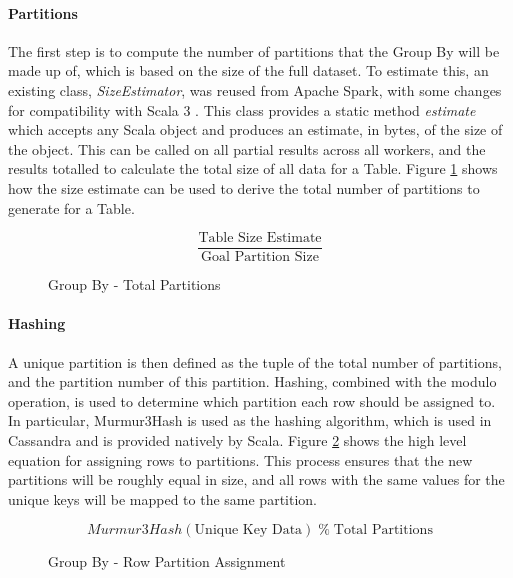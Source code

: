 \paragraph{Partitions}
The first step is to compute the number of partitions that the Group By will be made up of, which is based on the size of the full dataset. To estimate this, an existing class, \textit{SizeEstimator}, was reused from Apache Spark, with some changes for compatibility with Scala 3 \cite{zaharia2016spark}. This class provides a static method \textit{estimate} which accepts any Scala object and produces an estimate, in bytes, of the size of the object. This can be called on all partial results across all workers, and the results totalled to calculate the total size of all data for a Table. Figure \ref{fig:group-by-num-partitions} shows how the size estimate can be used to derive the total number of partitions to generate for a Table.

\begin{figure}[h]
	\centering
	\[ \frac{\text{Table Size Estimate}}{\text{Goal Partition Size}} \]
	\caption{Group By - Total Partitions}
	\label{fig:group-by-num-partitions}
\end{figure}



\paragraph{Hashing} 
A unique partition is then defined as the tuple of the total number of partitions, and the partition number of this partition. Hashing, combined with the modulo operation, is used to determine which partition each row should be assigned to. In particular, Murmur3Hash is used as the hashing algorithm, which is used in Cassandra and is provided natively by Scala. Figure \ref{fig:group-by-partition-assign} shows the high level equation for assigning rows to partitions. This process ensures that the new partitions will be roughly equal in size, and all rows with the same values for the unique keys will be mapped to the same partition.

\begin{figure}[h]
	\centering
	\[ Murmur3Hash(\text{Unique Key Data}) \; \%  \; \text{Total Partitions} \]
	\caption{Group By - Row Partition Assignment}
	\label{fig:group-by-partition-assign}
\end{figure} 

